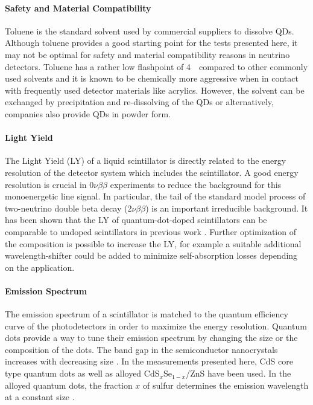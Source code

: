 \documentclass[cits]{JINST}
\begin{document}
\paragraph{Safety and Material Compatibility}
Toluene is the standard solvent used by commercial suppliers to dissolve QDs. Although toluene provides a good starting point for the tests presented here, it may not be optimal for safety and material compatibility reasons in neutrino detectors. Toluene has a rather low flashpoint of 4~\textcelsius ~compared to other commonly used solvents \cite{yeh2007} and it is known to be chemically more aggressive when in contact with frequently used detector materials like acrylics. However, the solvent can be exchanged by precipitation and re-dissolving of the QDs or alternatively, companies also provide QDs in powder form. 

\paragraph{Light Yield} 
The Light Yield (LY) of a liquid scintillator is directly related to the energy resolution of the detector system which includes the scintillator. A good energy resolution is crucial in 0$\nu\beta\beta$ experiments to reduce the background for this monoenergetic line signal. In particular, the tail of the standard model process of two-neutrino double beta decay (2$\nu\beta\beta$) is an important irreducible background. It has been shown that the LY of quantum-dot-doped scintillators can be comparable to undoped scintillators in previous work \cite{mitpaper}. Further optimization of the composition is possible to increase the LY, for example a suitable additional wavelength-shifter could be added to minimize self-absorption losses depending on the application.

\paragraph{Emission Spectrum}
The emission spectrum of a scintillator is matched to the quantum efficiency curve of the photodetectors in order to maximize the energy resolution. Quantum dots provide a way to tune their emission spectrum by changing the size or the composition of the dots. The band gap in the semiconductor nanocrystals increases with decreasing size \cite{alivisatos1996}. In the measurements presented here, CdS core type quantum dots as well as alloyed CdS$_x$Se$_{1-x}$/ZnS have been used. In the alloyed quantum dots, the fraction $x$ of sulfur determines the emission wavelength at a constant size \cite{swafford2006}. 
\end{document}
